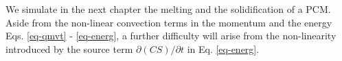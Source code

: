 We simulate in the next chapter the melting and the solidification of a PCM.
Aside from the non-linear convection terms in the momentum and the energy Eqs. \eqref{eq-qmvt} - \eqref{eq-energ}, a further difficulty will arise from the non-linearity introduced by the source term $\partial (CS)/\partial t$ in Eq. \eqref{eq-energ}.
